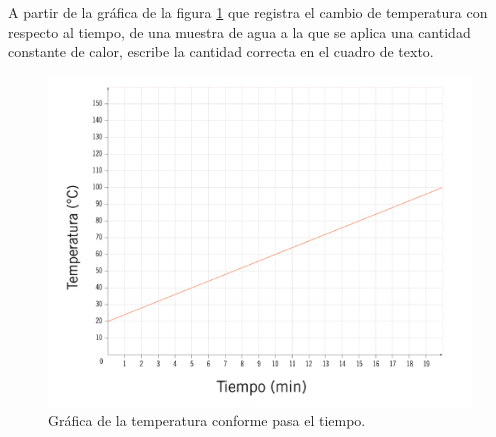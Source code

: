A partir de la gráfica de la figura \ref{fig:SINMAT1_U3_AC75_IMG3} que registra el cambio de temperatura con respecto al tiempo, de una muestra de agua a la que se aplica una cantidad constante de calor, escribe la cantidad correcta en el cuadro de texto.

\begin{multicols}{2}
    \begin{figure}[H]
        \centering
        \includegraphics[width=0.8\linewidth]{../images/SINMAT1_U3_AC75_IMG3.jpg}
        \caption{Gráfica de la temperatura conforme pasa el tiempo.}
        \label{fig:SINMAT1_U3_AC75_IMG3}
    \end{figure}
    \begin{parts}
       \part 
       \part 
       \part 
       \part 
       \part 
    \end{parts}
\end{multicols}